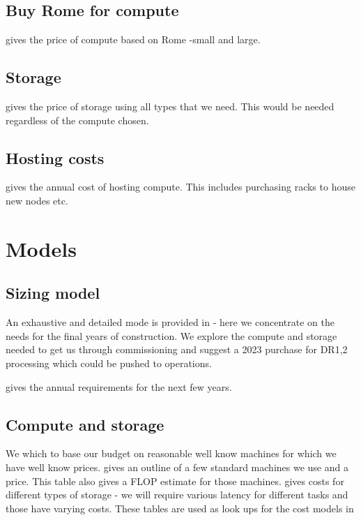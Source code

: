 \subsection{Buy Rome for compute} \label{sec:rome}
 gives the price of compute based on Rome -small and large.


\subsection{Storage} \label{sec:storagecost}
 gives the price of storage using all  types that we need.
This would be needed regardless of the compute chosen.


\subsection{Hosting costs} \label{sec:overheads}
 gives the annual cost of hosting compute. This includes purchasing racks to house
new nodes etc.


\section{ Models}\label{sec:model}
\subsection{Sizing model}\label{sec:sizemodel}

An exhaustive and detailed mode is provided in   - here we concentrate on the needs for the
final years of construction. We explore the compute and storage needed to get us through commissioning and suggest a 2023 purchase for DR1,2 processing which could be pushed to operations.

 gives the annual requirements for the next few years.



\subsection{Compute and storage }\label{sec:csmodel}
We which to base our budget on reasonable well know machines for which we have well know prices.
 gives an outline of a few standard machines we use and a price. This table also gives a FLOP estimate
for those machines.
 gives costs for different types of storage - we will require various latency for different tasks
and those have varying costs.
These tables are used as look ups for the cost models in 

